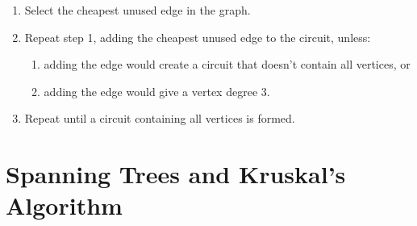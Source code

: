 \begin{algorithm}
  \begin{enumerate}
  \item Select the cheapest unused edge in the graph.
  \item Repeat step 1, adding the cheapest unused edge to the circuit,
    unless:
    \begin{enumerate}
    \item adding the edge would create a circuit that doesn't contain
      all vertices, or
    \item adding the edge would give a vertex degree 3.
    \end{enumerate}
  \item Repeat until a circuit containing all vertices is formed.
  \end{enumerate}
\end{algorithm}

\section{Spanning Trees and Kruskal's Algorithm}%
\label{sec:spanning-trees}



